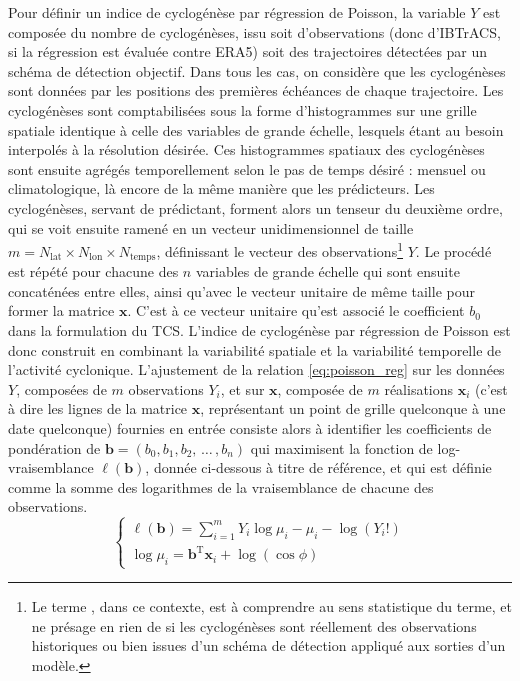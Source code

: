 \documentclass[../main.tex]{subfiles}
\begin{document}
Pour définir un indice de cyclogénèse par régression de Poisson, la variable $Y$ est composée du nombre de cyclogénèses, issu soit d'observations (donc
d'IBTrACS, si la régression est évaluée contre ERA5) soit des trajectoires détectées par un schéma de détection objectif. Dans tous les cas, on considère que
les cyclogénèses sont données par les positions des premières échéances de chaque trajectoire. Les cyclogénèses sont comptabilisées sous la forme d'histogrammes
sur une grille spatiale identique à celle des variables de grande échelle, lesquels étant au besoin interpolés à la résolution désirée. Ces histogrammes
spatiaux des cyclogénèses sont ensuite agrégés temporellement selon le pas de temps désiré : mensuel ou climatologique, là encore de la même manière que les
prédicteurs. Les cyclogénèses, servant de prédictant, forment alors un tenseur du deuxième ordre, qui se voit ensuite ramené en un vecteur unidimensionnel de
taille $m = N_{\mathrm{lat}} \times N_{\mathrm{lon}} \times N_{\mathrm{temps}}$, définissant le vecteur des observations\footnote{Le terme
, dans ce contexte, est à comprendre au sens statistique du terme, et ne présage en rien de si les cyclogénèses sont réellement des
observations historiques ou bien issues d'un schéma de détection appliqué aux sorties d'un modèle.} $Y$. Le procédé est répété pour chacune des $n$ variables de
grande échelle qui sont ensuite concaténées entre elles, ainsi qu'avec le vecteur unitaire de même taille pour former la matrice $\mathbf{x}$. C'est à ce
vecteur unitaire qu'est associé le coefficient $b_0$ dans la formulation du TCS. L'indice de cyclogénèse par régression de Poisson est donc construit en
combinant la variabilité spatiale et la variabilité temporelle de l'activité cyclonique. L'ajustement de la relation \ref{eq:poisson_reg} sur les données $Y$,
composées de $m$ observations $Y_i$, et sur $\mathbf{x}$, composée de $m$ réalisations $\mathbf{x}_i$ (c'est à dire les lignes de la matrice $\mathbf{x}$,
représentant un point de grille quelconque à une date quelconque) fournies en entrée consiste alors à identifier les coefficients de pondération de $\mathbf{b}
= (b_0, b_1, b_2, \, \ldots \, , b_n)$ qui maximisent la fonction de log-vraisemblance $\ell (\mathbf{b})$, donnée ci-dessous à titre de référence, et qui est
définie comme la somme des logarithmes de la vraisemblance de chacune des observations.
%
\begin{equation*}
    \begin{cases}
        \ell(\mathbf{b}) = \sum_{i = 1}^{m} Y_i \log \mu_i - \mu_i - \log(Y_i !) \\
        \log \mu_i = \mathbf{b}^{\mathrm{T}} \mathbf{x}_i + \log ( \cos \phi )
    \end{cases}
\end{equation*}
\end{document}
